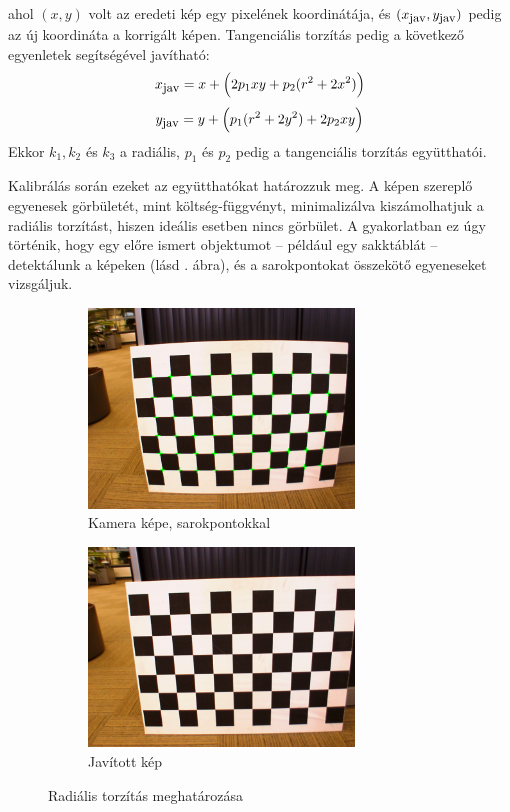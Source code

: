ahol $(x,y)$ volt az eredeti kép egy pixelének koordinátája, és $(x_{\hbox{\small jav}}, y_{\hbox{\small jav}})$ pedig az új koordináta a korrigált képen. Tangenciális torzítás pedig a következő egyenletek segítségével javítható:
\[x_{\hbox{\small jav}} = x + \Big(2p_1xy + p_2(r^2+2x^2)\Big)\]
\[y_{\hbox{\small jav}} = y + \Big(p_1(r^2+2y^2) + 2p_2xy\Big)\]
Ekkor $k_1, k_2$ és $k_3$ a radiális, $p_1$ és $p_2$ pedig a tangenciális torzítás együtthatói.

Kalibrálás során ezeket az együtthatókat határozzuk meg. A képen szereplő egyenesek görbületét, mint költség-függvényt, minimalizálva kiszámolhatjuk a radiális torzítást, hiszen ideális esetben nincs görbület. A gyakorlatban ez úgy történik, hogy egy előre ismert objektumot -- például egy sakktáblát -- detektálunk a képeken (lásd . ábra), és a sarokpontokat összekötő egyeneseket vizsgáljuk.

\begin{figure}[tbh]
\centering
\begin{subfigure}[b]{0.49\linewidth}
	\centering
	\includegraphics[width=200pt]{figures/distorted.png}
	\caption{Kamera képe, sarokpontokkal}
  \end{subfigure}
\begin{subfigure}[b]{0.49\linewidth}
	\centering
	\includegraphics[width=200pt]{figures/undistorted.png}
	\caption{Javított kép}
  \end{subfigure}
\caption{Radiális torzítás meghatározása \cite{pinhole-model} \label{fig:chessboards}}
\end{figure}

